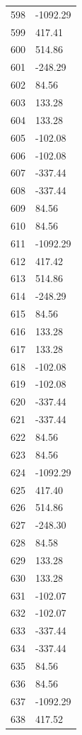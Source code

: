 \documentclass[a4paper,11pt]{article}
\begin{document}
\begin{center}
\begin{longtable}{|R{1.5cm}|R{2.5cm}|}
  598 &     -1092.29 \\
  599 &       417.41 \\
  600 &       514.86 \\
  601 &      -248.29 \\
  602 &        84.56 \\
  603 &       133.28 \\
  604 &       133.28 \\
  605 &      -102.08 \\
  606 &      -102.08 \\
  607 &      -337.44 \\
  608 &      -337.44 \\
  609 &        84.56 \\
  610 &        84.56 \\
  611 &     -1092.29 \\
  612 &       417.42 \\
  613 &       514.86 \\
  614 &      -248.29 \\
  615 &        84.56 \\
  616 &       133.28 \\
  617 &       133.28 \\
  618 &      -102.08 \\
  619 &      -102.08 \\
  620 &      -337.44 \\
  621 &      -337.44 \\
  622 &        84.56 \\
  623 &        84.56 \\
  624 &     -1092.29 \\
  625 &       417.40 \\
  626 &       514.86 \\
  627 &      -248.30 \\
  628 &        84.58 \\
  629 &       133.28 \\
  630 &       133.28 \\
  631 &      -102.07 \\
  632 &      -102.07 \\
  633 &      -337.44 \\
  634 &      -337.44 \\
  635 &        84.56 \\
  636 &        84.56 \\
  637 &     -1092.29 \\
  638 &       417.52 \\

\end{longtable}
\end{center}
\end{document}
